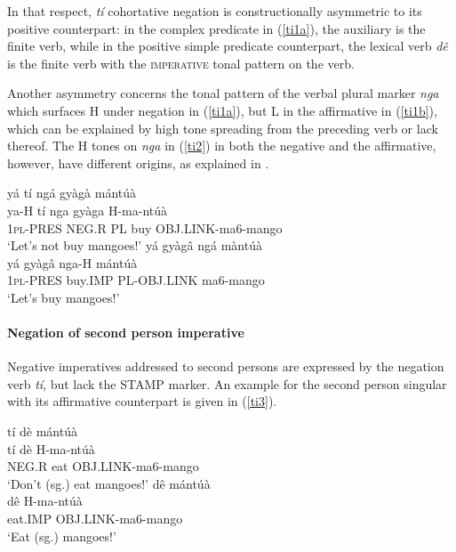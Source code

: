 In that respect, {\itshape tí} cohortative negation is constructionally asymmetric to its positive counterpart: in the complex predicate in (\ref{ti1a}), the auxiliary is the finite verb, while in the positive simple predicate counterpart, the lexical verb {\itshape dê} is the finite verb with the \textsc{imperative} tonal pattern on the verb. 

Another asymmetry concerns the tonal pattern of the verbal plural marker {\itshape nga} which surfaces H under negation in (\ref{ti1a}), but L in the affirmative in (\ref{ti1b}), which can be explained by high tone spreading from the preceding verb or lack thereof. The H tones on {\itshape nga} in (\ref{ti2})  in both the negative and the affirmative, however,  have different origins, as explained in . 

\begin{exe} 
\ex\label{ti2}
\begin{xlist}
\ex\label{ti2a}
  \glll  yá tí ngá gyàgà mántúà \\
        ya-H tí nga gyàga H-ma-ntúà \\
           1\textsc{pl}-PRES NEG.R PL buy OBJ.LINK-ma6-mango \\
    \trans `Let's not buy mangoes!'
\ex\label{ti2b}
  \glll  yá gyàgâ ngá màntúà \\
        yá gyàgâ nga-H mántúà \\
           1\textsc{pl}-PRES buy.IMP PL-OBJ.LINK ma6-mango  \\
    \trans `Let's buy mangoes!'
\end{xlist}
\end{exe}









\paragraph{Negation of second person imperative}
Negative imperatives addressed to second persons are expressed by the negation verb {\itshape tí}, but lack the STAMP marker.  An example for the second person singular with its affirmative counterpart is given in (\ref{ti3}).

\begin{exe}
\ex\label{ti3}
\begin{xlist}
\ex\label{ti3a}
  \glll   tí dè mántúà \\
          tí dè H-ma-ntúà  \\
         NEG.R eat OBJ.LINK-ma6-mango   \\
    \trans `Don't (sg.) eat mangoes!'
\ex\label{ti3b}
  \glll   dê mántúà \\
          dê H-ma-ntúà  \\
         eat.IMP OBJ.LINK-ma6-mango   \\
    \trans `Eat (sg.) mangoes!'
\end{xlist}
\end{exe}

